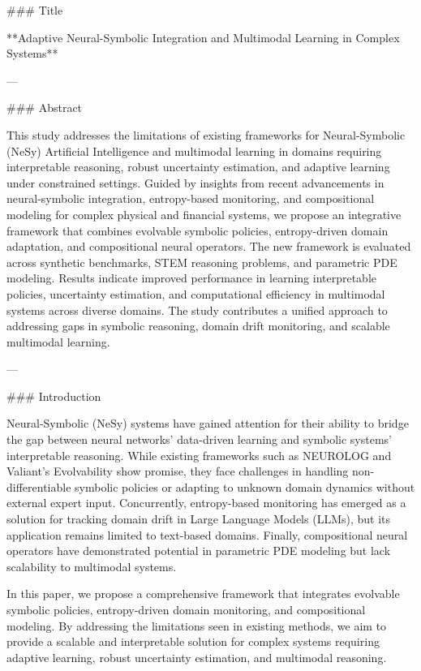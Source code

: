 ### Title

**Adaptive Neural-Symbolic Integration and Multimodal Learning in Complex Systems**

---

### Abstract

This study addresses the limitations of existing frameworks for Neural-Symbolic (NeSy) Artificial Intelligence and multimodal learning in domains requiring interpretable reasoning, robust uncertainty estimation, and adaptive learning under constrained settings. Guided by insights from recent advancements in neural-symbolic integration, entropy-based monitoring, and compositional modeling for complex physical and financial systems, we propose an integrative framework that combines evolvable symbolic policies, entropy-driven domain adaptation, and compositional neural operators. The new framework is evaluated across synthetic benchmarks, STEM reasoning problems, and parametric PDE modeling. Results indicate improved performance in learning interpretable policies, uncertainty estimation, and computational efficiency in multimodal systems across diverse domains. The study contributes a unified approach to addressing gaps in symbolic reasoning, domain drift monitoring, and scalable multimodal learning.

---

### Introduction

Neural-Symbolic (NeSy) systems have gained attention for their ability to bridge the gap between neural networks' data-driven learning and symbolic systems' interpretable reasoning. While existing frameworks such as NEUROLOG and Valiant's Evolvability show promise, they face challenges in handling non-differentiable symbolic policies or adapting to unknown domain dynamics without external expert input. Concurrently, entropy-based monitoring has emerged as a solution for tracking domain drift in Large Language Models (LLMs), but its application remains limited to text-based domains. Finally, compositional neural operators have demonstrated potential in parametric PDE modeling but lack scalability to multimodal systems.

In this paper, we propose a comprehensive framework that integrates evolvable symbolic policies, entropy-driven domain monitoring, and compositional modeling. By addressing the limitations seen in existing methods, we aim to provide a scalable and interpretable solution for complex systems requiring adaptive learning, robust uncertainty estimation, and multimodal reasoning.

